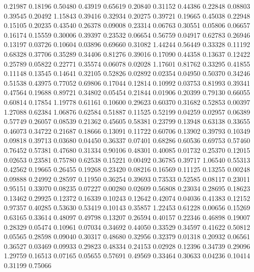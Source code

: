   0.21987 0.18196
  0.50480 0.43919
  0.65619 0.20840
  0.31152 0.44386
  0.22848 0.08803
  0.39545 0.20492
  1.15843 0.39416
  0.32934 0.20275
  0.39721 0.19665
  0.45038 0.22948
  0.15105 0.20235
  0.43540 0.26378
  0.09008 0.23314
  0.06763 0.30551
  0.05806 0.06657
  0.16174 0.15559
  0.30006 0.39397
  0.23532 0.06654
  0.56759 0.04917
  0.62783 0.26946
  0.13197 0.03726
  0.10604 0.03896
  0.69660 0.31082
  1.44244 0.56449
  0.33328 0.11192
  0.68328 0.37706
  0.35289 0.34406
  0.81276 0.39016
  0.17090 0.44358
  0.13637 0.12422
  0.25789 0.05822
  0.22771 0.35574
  0.06078 0.02028
  1.17601 0.81762
  0.33295 0.41855
  0.11148 0.13545
  0.14641 0.32105
  0.52826 0.02892
  0.02354 0.04950
  0.50370 0.34246
  0.51538 0.43975
  0.77052 0.69806
  0.17044 0.12814
  0.10992 0.03753
  0.81993 0.39341
  0.47564 0.19688
  0.89721 0.34802
  0.05454 0.21844
  0.01906 0.20399
  0.79130 0.66055
  0.60814 0.17854
  1.19778 0.61161
  0.10600 0.29623
  0.60370 0.31682
  0.52853 0.00397
  1.27088 0.62384
  1.06876 0.62584
  0.51887 0.11525
  0.52199 0.04259
  0.02957 0.06389
  0.57749 0.26057
  0.08539 0.21362
  0.45605 0.58381
  0.23799 0.13948
  0.63138 0.33655
  0.46073 0.34722
  0.21687 0.18666
  0.13091 0.11722
  0.60706 0.13902
  0.39793 0.10349
  0.09818 0.39713
  0.03680 0.04450
  0.36337 0.07401
  0.68286 0.60536
  0.69753 0.57460
  0.76452 0.57381
  0.47680 0.31334
  0.90106 0.48301
  0.40085 0.01732
  0.25370 0.12015
  0.02653 0.23581
  0.75780 0.62538
  0.15221 0.00492
  0.36785 0.39717
  1.06540 0.55313
  0.42562 0.19665
  0.26455 0.19268
  0.23420 0.08216
  0.16569 0.11125
  0.13255 0.00248
  0.09888 0.24992
  0.28597 0.11950
  0.36254 0.39693
  0.73533 0.52585
  0.08117 0.23011
  0.95151 0.33070
  0.08235 0.07227
  0.00280 0.02609
  0.56808 0.23034
  0.28695 0.18623
  0.13462 0.29925
  0.12372 0.16339
  0.10243 0.12642
  0.42074 0.04036
  0.41383 0.12152
  0.97357 0.40285
  0.53630 0.53419
  0.10143 0.35857
  1.22453 0.61228
  0.00656 0.15269
  0.63165 0.33614
  0.48097 0.49798
  0.13207 0.26594
  0.40157 0.22346
  0.46898 0.19007
  0.28329 0.05474
  0.10961 0.07034
  0.34692 0.44050
  0.33529 0.34597
  0.41622 0.50812
  0.05565 0.28598
  0.09040 0.30317
  0.48680 0.32956
  0.32379 0.01318
  0.20932 0.06561
  0.36527 0.03469
  0.09933 0.29823
  0.48334 0.24153
  0.02928 0.12396
  0.34739 0.29096
  1.29759 0.16513
  0.07165 0.05655
  0.57691 0.49569
  0.33464 0.30633
  0.04236 0.10414
  0.31199 0.75066
